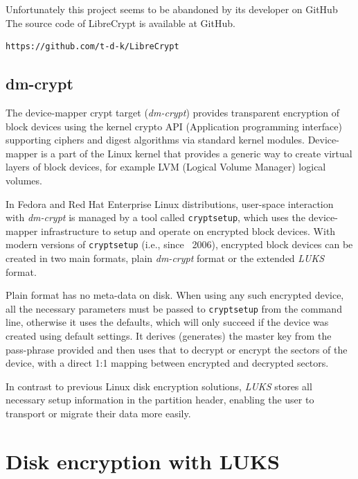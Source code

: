 Unfortunately this project seems to be abandoned by its developer on GitHub
The source code of LibreCrypt is available at GitHub.
\begin{lstlisting}[columns=fixed,basicstyle=\ttfamily\footnotesize,tabsize=4,backgroundcolor=\color{yellow!10}]
https://github.com/t-d-k/LibreCrypt
\end{lstlisting}



\subsection{dm-crypt}\label{dm-crypt}

The device-mapper crypt target ({\it dm-crypt}) provides transparent encryption of block devices using the kernel crypto API (Application programming interface) supporting ciphers and digest algorithms via standard kernel modules.
Device-mapper is a part of the Linux kernel that provides a generic way to create virtual layers of block devices, for example LVM (Logical Volume Manager) logical volumes.

In Fedora and Red Hat Enterprise Linux distributions, user-space interaction with {\it dm-crypt} is managed by a tool called {\tt cryptsetup}, which uses the device-mapper infrastructure to setup and operate on encrypted block devices.
With modern versions of {\tt cryptsetup} (i.e., since ~2006), encrypted block devices can be created in two main formats, plain {\it dm-crypt} format or the extended {\it LUKS} format.

Plain format has no meta-data on disk.
When using any such encrypted device, all the necessary parameters must be passed to {\tt cryptsetup} from the command line, otherwise it uses the defaults, which will only succeed if the device was created using default settings.
It derives (generates) the master key from the pass-phrase provided and then uses that to decrypt or encrypt the sectors of the device, with a direct 1:1 mapping between encrypted and decrypted sectors.

In contrast to previous Linux disk encryption solutions, {\it LUKS} stores all necessary setup information in the partition header, enabling the user to transport or migrate their data more easily.



\section{Disk encryption with LUKS}

